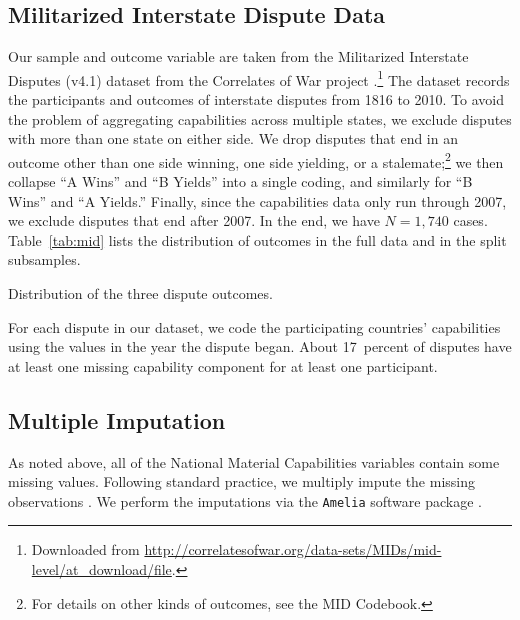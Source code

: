 \subsection{Militarized Interstate Dispute Data}

Our sample and outcome variable are taken from the Militarized Interstate Disputes (v4.1) dataset from the Correlates of War project \citep{Palmer:2015hp}.\footnote{
  Downloaded from \url{http://correlatesofwar.org/data-sets/MIDs/mid-level/at_download/file}.
}
The dataset records the participants and outcomes of interstate disputes from 1816 to 2010.
To avoid the problem of aggregating capabilities across multiple states, we exclude disputes with more than one state on either side.
We drop disputes that end in an outcome other than one side winning, one side yielding, or a stalemate;\footnote{
  For details on other kinds of outcomes, see the MID Codebook.
}
we then collapse ``A Wins'' and ``B Yields'' into a single coding, and similarly for ``B Wins'' and ``A Yields.''
Finally, since the capabilities data only run through 2007, we exclude disputes that end after 2007.
In the end, we have $N = 1{,}740$ cases.
Table~\ref{tab:mid} lists the distribution of outcomes in the full data and in the split subsamples.

\begin{table}[htp]
  \centering
  
  \caption{
    Distribution of the three dispute outcomes.
  }
  \label{tab:mid}
\end{table}

For each dispute in our dataset, we code the participating countries' capabilities using the values in the year the dispute began.
About 17~percent of disputes have at least one missing capability component for at least one participant.

\subsection{Multiple Imputation}

As noted above, all of the National Material Capabilities variables contain some missing values.
Following standard practice, we multiply impute the missing observations \citep{honaker_what_2010}.
We perform the imputations via the \texttt{Amelia} software package \citep{pkg-Amelia}.

